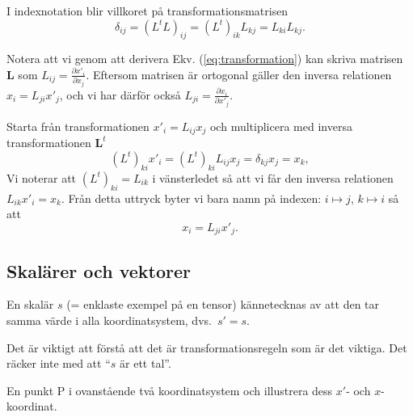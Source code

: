 \documentclass[%
oneside,                 %
final,                   %
10pt]{article}
\newenvironment{notice_mdfboxadmon}[1][]{
\begin{notice_mdfboxmdframed}[frametitle=#1]
}
{
\end{notice_mdfboxmdframed}
}
\newenvironment{warning_mdfboxadmon}[1][]{
\begin{warning_mdfboxmdframed}[frametitle=#1]
}
{
\end{warning_mdfboxmdframed}
}
\begin{document}
I indexnotation blir villkoret på transformationsmatrisen
\begin{equation}
\delta_{ij} = \left( L^t L \right)_{ij} = \left( L^t \right)_{ik} L_{kj} 
= L_{ki}L_{kj}.
\end{equation}

Notera att vi genom att derivera Ekv. (\ref{eq:transformation}) kan skriva matrisen $\mathbf{L}$ som $L_{ij}=\frac{\partial x'_i}{\partial x_j}$. Eftersom matrisen är ortogonal gäller den inversa relationen $x_i=L_{ji}x'_j$, och vi har därför också $L_{ji}=\frac{\partial x_i}{\partial x'_j}$.


\begin{notice_mdfboxadmon}
Starta från transformationen $x'_i=L_{ij}x_j$ och multiplicera med inversa transformationen $\mathbf{L}^t$
\begin{equation}
(L^t)_{ki} x'_i=(L^t)_{ki} L_{ij}x_j = \delta_{kj} x_j = x_k,
\end{equation}
Vi noterar att $(L^t)_{ki} = L_{ik}$ i vänsterledet så att vi får den inversa relationen $L_{ik} x'_i = x_k$. Från detta uttryck byter vi bara namn på indexen: $i \mapsto j$, $k \mapsto i$ så att
\begin{equation}
x_i=L_{ji} x'_j.
\label{eq:inverstransformation}
\end{equation}
\end{notice_mdfboxadmon} %



\subsection*{Skalärer och vektorer}
En skalär $s$ (= enklaste exempel på en tensor) kännetecknas av att den tar samma värde i alla koordinatsystem, dvs.~$s'=s$. 


\begin{warning_mdfboxadmon}[Kommentar]
Det är viktigt att förstå att det är transformationsregeln som är det viktiga. Det räcker inte med att ``$s$ är ett tal''.
\end{warning_mdfboxadmon} %




\begin{warning_mdfboxadmon}[Rita]
En punkt P i ovanstående två koordinatsystem och illustrera dess $x'$- och $x$-koordinat.
\end{warning_mdfboxadmon} %
\end{document}
